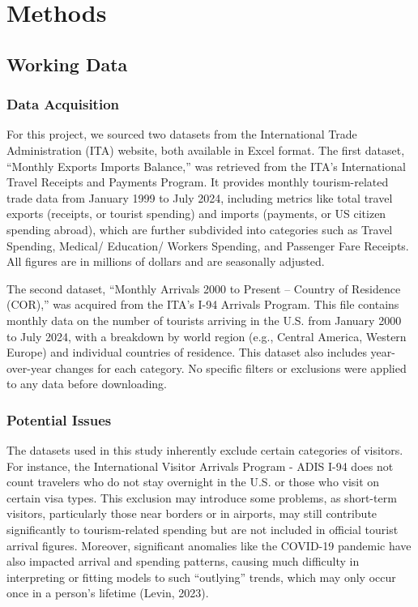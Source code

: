 \documentclass[11pt]{article}
\begin{document}
\section{Methods}

\subsection{Working Data}

\subsubsection{Data Acquisition}

For this project, we sourced two datasets from the International Trade Administration (ITA) website, both available in Excel format. The first dataset, ``Monthly Exports Imports Balance,'' was retrieved from the ITA's International Travel Receipts and Payments Program. It provides monthly tourism-related trade data from January 1999 to July 2024, including metrics like total travel exports (receipts, or tourist spending) and imports (payments, or US citizen spending abroad), which are further subdivided into categories such as Travel Spending, Medical/ Education/ Workers Spending, and Passenger Fare Receipts. All figures are in millions of dollars and are seasonally adjusted.

The second dataset, ``Monthly Arrivals 2000 to Present -- Country of Residence (COR),'' was acquired from the ITA's I-94 Arrivals Program. This file contains monthly data on the number of tourists arriving in the U.S. from January 2000 to July 2024, with a breakdown by world region (e.g., Central America, Western Europe) and individual countries of residence. This dataset also includes year-over-year changes for each category. No specific filters or exclusions were applied to any data before downloading.

\subsubsection{Potential Issues}

The datasets used in this study inherently exclude certain categories of visitors. For instance, the International Visitor Arrivals Program - ADIS I-94 does not count travelers who do not stay overnight in the U.S. or those who visit on certain visa types. This exclusion may introduce some problems, as short-term visitors, particularly those near borders or in airports, may still contribute significantly to tourism-related spending but are not included in official tourist arrival figures. Moreover, significant anomalies like the COVID-19 pandemic have also impacted arrival and spending patterns, causing much difficulty in interpreting or fitting models to such ``outlying'' trends, which may only occur once in a person's lifetime (Levin, 2023).
\end{document}
